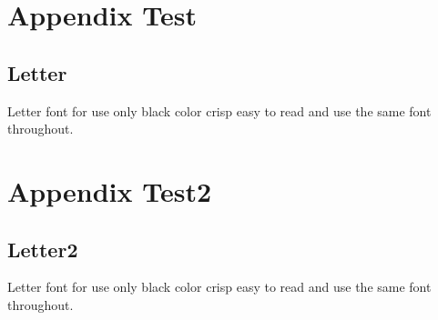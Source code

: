 \begin{appendices}
\chapter{Appendix Test}

\section{Letter}
Letter font for use only black color crisp easy to read and use the same font throughout.

\chapter{Appendix Test2}

\section{Letter2}
Letter font for use only black color crisp easy to read and use the same font throughout.

\end{appendices}